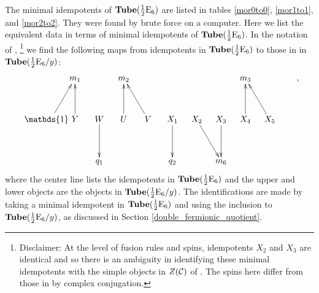 The minimal idempotents of $\textbf{Tube}(\frac{1}{2}\text{E}_6)$ are listed in tables \ref{mor0to0}, \ref{mor1to1}, and \ref{mor2to2}.
They were found by brute force on a computer.
Here we list the equivalent data in terms of minimal idempotents of $\textbf{Tube}(\frac{1}{2}\text{E}_6)$.
In the notation of \cite{Hong2008},
\footnote{Disclaimer: At the level of fusion rules and spins,
 idempotents $X_2$ and $X_3$ are identical and so there is an ambiguity in identifying these minimal idempotents with the simple objects in $Z(\mathcal{C})$ of \cite{Hong2008}.
The spins here differ from those in \cite{Hong2008} by complex conjugation. } 
we find the following maps from idempotents in $\textbf{Tube}(\frac{1}{2}\text{E}_6)$ to those in in $\textbf{Tube}(\frac{1}{2}\text{E}_6 / y)$:
\begin{align}
\xymatrix @!0 @M=1mm @C=10mm{
& &m_1 && m_2 && &&& m_3 &&  \\
 \\
 \quad&\mathds{1} \ar[ruu] \quad & Y \ar[uu] & W\ar[dd] & U\ar[uu] & V \ar[uul] & X_1 \ar[dd] & X_{2}\ar[ddr] &X_{3} \ar[dd] & X_4\ar[uu] & X_5\ar[uul] &  \\
\\
&&&q_1& &&q_2 &&m_6& &&  \\
},
\end{align}
where the center line lists the idempotents in $\textbf{Tube}(\frac{1}{2}\text{E}_6)$ and the upper and lower objects are the objects in $\textbf{Tube}(\frac{1}{2}\text{E}_6 / y)$.
The identifications are made by taking a minimal idempotent in $\textbf{Tube}(\frac{1}{2}\text{E}_6)$ and using the inclusion to $\textbf{Tube}(\frac{1}{2}\text{E}_6/y)$, 
as discussed in Section \ref{double_fermionic_quotient}.




